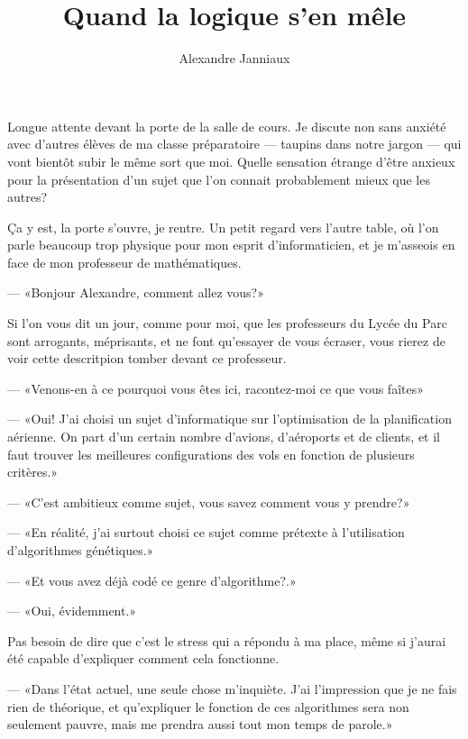 \documentclass[letterpaper, 12pt]{report} %
\title{Quand la logique s'en mêle}
\author{Alexandre Janniaux}
\begin{document}
  \doublespacing{}

  \maketitle

  
  
  {
      \vspace{0pt}%
Longue attente devant la porte de la salle de cours. 
Je discute non sans anxiété avec d'autres élèves de ma classe préparatoire --- taupins dans notre jargon --- qui vont bientôt subir le même sort que moi.
Quelle sensation étrange d'être anxieux pour la présentation d'un sujet que l'on connait probablement mieux que les autres?

Ça y est, la porte s'ouvre, je rentre. Un petit regard vers l'autre table, où l'on parle beaucoup trop physique pour mon esprit d'informaticien, et je m'asseois en face de mon professeur de mathématiques.

--- «Bonjour Alexandre, comment allez vous?»

Si l'on vous dit un jour, comme pour moi, que les professeurs du Lycée du Parc sont arrogants, méprisants, et ne font qu'essayer de vous écraser, vous rierez de voir cette descritpion tomber devant ce professeur.


--- «Venons-en à ce pourquoi vous êtes ici, racontez-moi ce que vous faîtes»

--- «Oui! J'ai choisi un sujet d'informatique sur l'optimisation de la planification aérienne. On part d'un certain nombre d'avions, d'aéroports et de clients, et il faut trouver les meilleures configurations des vols en fonction de plusieurs critères.»

--- «C'est ambitieux comme sujet, vous savez comment vous y prendre?» %

--- «En réalité, j'ai surtout choisi ce sujet comme prétexte à l'utilisation d'algorithmes génétiques.»

--- «Et vous avez déjà codé ce genre d'algorithme?.»

--- «Oui, évidemment.»

Pas besoin de dire que c'est le stress qui a répondu à ma place, même si j'aurai été capable d'expliquer comment cela fonctionne. 

--- «Dans l'état actuel, une seule chose m'inquiète. 
		J'ai l'impression que je ne fais rien de théorique, et qu'expliquer le fonction de ces algorithmes sera non seulement pauvre, mais me prendra aussi tout mon temps de parole.»

}
\end{document}
